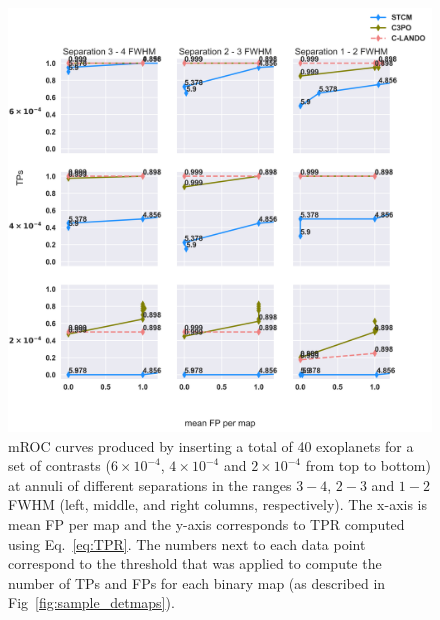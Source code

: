 \documentclass{aa}
\begin{document}
\begin{figure}
\centering
    \includegraphics[width=1.0\textwidth]{fig4_dec2023.png}
\caption{ mROC curves produced by inserting a total of 40 exoplanets for a set of contrasts ($6 \times 10^{-4}$, $4 \times 10^{-4}$ and $2 \times 10^{-4}$ from top to bottom) at annuli of different separations in the ranges $3-4$, $2-3$ and $1-2$ FWHM (left, middle, and right columns, respectively).
The x-axis is mean FP per map and the y-axis corresponds to TPR computed using Eq.~\ref{eq:TPR}. 
The numbers next to each data point correspond to the threshold that was applied to compute the number of TPs and FPs for each binary map (as described in Fig~\ref{fig:sample_detmaps}).
}
\end{figure}
\end{document}
